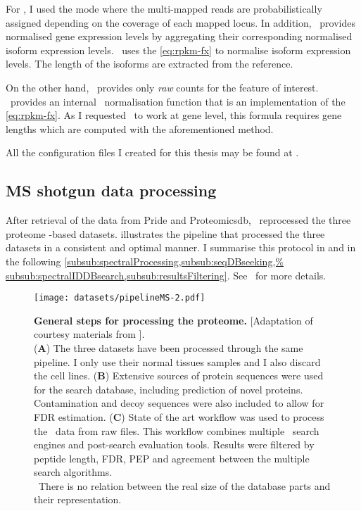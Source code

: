 For \cuffl, I used the mode where the multi-mapped reads are probabilistically
assigned depending on the coverage of each mapped locus. In addition,
\cuffl\ provides normalised gene expression levels by aggregating their
corresponding normalised isoform expression levels. \cuffl\ uses the
\cref{eq:rpkm-fx} to normalise isoform expression levels. The length of the
isoforms are extracted from the reference.

On the other hand, \htseq\ provides only \emph{raw} counts for the feature of
interest. \irap\ provides an internal \FPKM\ normalisation function that
is an implementation of the \cref{eq:rpkm-fx}. As I requested \htseq\ to work at
gene level, this formula requires gene lengths which are computed with the
aforementioned method.

All the configuration files I created for this thesis may be found at
\addressToirapConfFiles.

\subsection{MS shotgun data processing}

After retrieval of the data from \gls{Pride} and \gls{Proteomicsdb},
\james\ reprocessed the three proteome \ms-based datasets.
 illustrates the pipeline that processed the three
datasets in a consistent and optimal manner. I summarise this protocol
in 
and in the following \cref{subsub:spectralProcessing,subsub:seqDBseeking,%
subsub:spectralIDDBsearch,subsub:resultsFiltering}.
See~ for more details.

  \begin{sidewaysfigure}
      \texttt{[image: datasets/pipelineMS-2.pdf]}\centering
      \caption[General steps for processing the proteome
      data]{\label{fig:pipelineProt}\textbf{General steps for processing the
      proteome.} [Adaptation of courtesy materials from \james].\\
      (\textbf{A}) The three datasets have been processed through the
      same pipeline. I only use their normal tissues samples and I also discard
      the cell lines. (\textbf{B}) Extensive sources of protein sequences were
      used for the search database, including prediction of novel proteins.
      Contamination and decoy sequences were also included to allow for \gls{FDR}
      estimation. (\textbf{C}) State of the art workflow was used to process the
      \ms\ data from raw files.
      This workflow combines multiple \ms\ search engines and
      post-search evaluation tools. Results were filtered by peptide length,
      \gls{FDR}, \gls{PEP} and agreement between the multiple search algorithms.
      \\\NB\ There is no relation between the real size of
      the database parts and their representation.}
  \end{sidewaysfigure}

